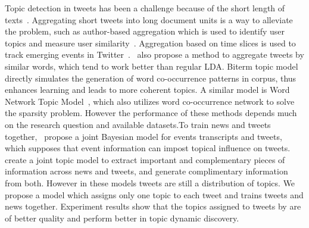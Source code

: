 Topic detection in tweets has been a challenge because of the short length of texts~\cite{yan2013biterm}. Aggregating short tweets into long document units is a way to alleviate the problem, such as author-based aggregation which is used to identify user topics and measure user similarity~\cite{weng2010twitterrank}. Aggregation based on time slices is used to track emerging events in Twitter~\cite{lau2012line}.~ also propose a method to aggregate tweets by similar words, which tend to work better than regular LDA. Biterm topic model~\cite[BTM]{yan2013biterm} directly simulates the generation of word co-occurrence patterns in corpus, thus enhances learning and leads to more coherent topics. A similar model is Word Network Topic Model~\cite{zuo2014word}, which also utilizes word co-occurrence network to solve the sparsity problem. However the performance of these methods depends much on the research question and available datasets.To train news and tweets together,~ propose a joint Bayesian model for events transcripts and tweets, which supposes that event information can impost topical influence on tweets.~ create a joint topic model to extract important and complementary pieces of information across news and tweets, and generate complimentary information from both. However in these models tweets are still a distribution of topics. We propose a \stlda model which assigns only one topic to each tweet and trains tweets and news together. Experiment results show that the topics assigned to tweets by \stlda are of better quality and perform better in topic dynamic discovery. 